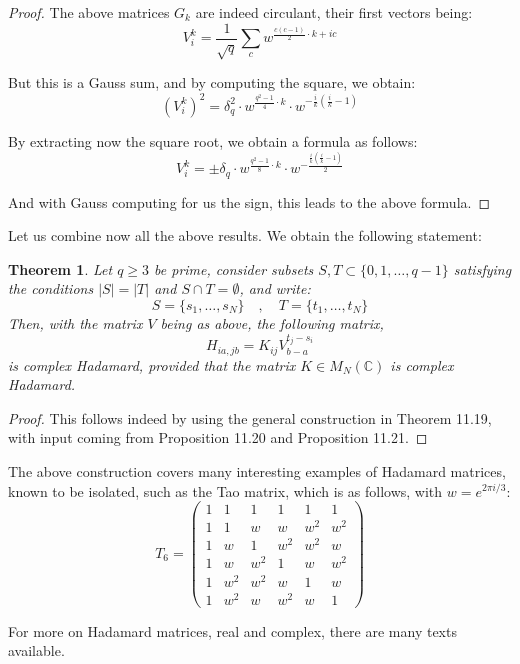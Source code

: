 \documentclass[12pt]{amsbook}
\newtheorem{theorem}{Theorem}[chapter]
\begin{document}
\begin{proof}
The above matrices $G_k$ are indeed circulant, their first vectors being:
$$V^k_i=\frac{1}{\sqrt{q}}\sum_cw^{\frac{c(c-1)}{2}\cdot k+ic}$$

But this is a Gauss sum, and by computing the square, we obtain:
$$(V^k_i)^2=\delta_q^2\cdot w^{\frac{q^2-1}{4}\cdot k}\cdot w^{-\frac{i}{k}(\frac{i}{k}-1)}$$

By extracting now the square root, we obtain a formula as follows:
$$V^k_i=\pm\delta_q\cdot w^{\frac{q^2-1}{8}\cdot k}\cdot w^{-\frac{\frac{i}{k}(\frac{i}{k}-1)}{2}}$$

And with Gauss computing for us the sign, this leads to the above formula.
\end{proof}

Let us combine now all the above results. We obtain the following statement:


\begin{theorem}
Let $q\geq3$ be prime, consider subsets $S,T\subset\{0,1,\ldots,q-1\}$ satisfying the conditions $|S|=|T|$ and $S\cap T=\emptyset$, and write:
$$S=\{s_1,\ldots,s_N\}\quad,\quad 
T=\{t_1,\ldots,t_N\}$$
Then, with the matrix $V$ being as above, the following matrix,
$$H_{ia,jb}=K_{ij}V^{t_j-s_i}_{b-a}$$
is complex Hadamard, provided that the matrix $K\in M_N(\mathbb C)$ is complex Hadamard.
\end{theorem}

\begin{proof}
This follows indeed by using the general construction in Theorem 11.19, with input coming from Proposition 11.20 and Proposition 11.21.
\end{proof}

The above construction covers many interesting examples of Hadamard matrices, known to be isolated, such as the Tao matrix, which is as follows, with $w=e^{2\pi i/3}$:
$$T_6=\begin{pmatrix}
1&1&1&1&1&1\\ 
1&1&w&w&w^2&w^2\\ 
1&w&1&w^2&w^2&w\\
1&w&w^2&1&w&w^2\\ 
1&w^2&w^2&w&1&w\\ 
1&w^2&w&w^2&w&1
\end{pmatrix}$$

For more on Hadamard matrices, real and complex, there are many texts available.
\end{document}
